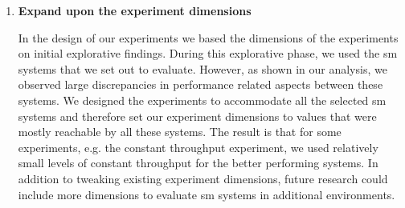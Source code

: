 \begin{enumerate}
    
    \item \textbf{Expand upon the experiment dimensions}
    
    In the design of our experiments we based the dimensions of the experiments on initial explorative findings. During this explorative phase, we used the \gls{sm} systems that we set out to evaluate. However, as shown in our analysis, we observed large discrepancies in performance related aspects between these systems. We designed the experiments to accommodate all the selected \gls{sm} systems and therefore set our experiment dimensions to values that were mostly reachable by all these systems. The result is that for some experiments, e.g. the constant throughput experiment, we used relatively small levels of constant throughput for the better performing systems. In addition to tweaking existing experiment dimensions, future research could include more dimensions to evaluate \gls{sm} systems in additional environments.

\end{enumerate}